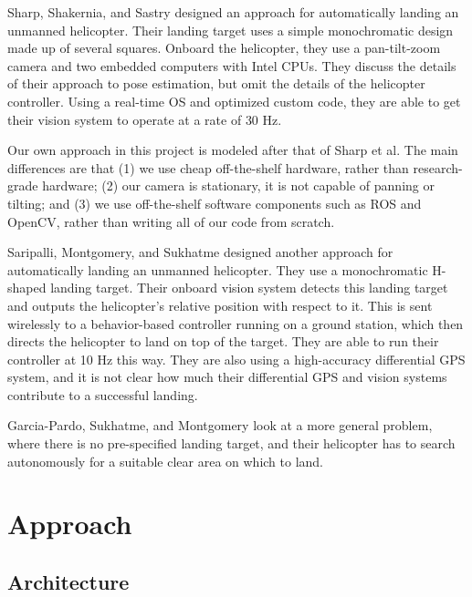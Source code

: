 \documentclass[10pt]{scrartcl} %
\begin{document}
Sharp, Shakernia, and Sastry \cite{sharp_et_al_2001} designed an approach for
automatically landing an unmanned helicopter. Their landing target uses a
simple monochromatic design made up of several squares. Onboard the helicopter,
they use a pan-tilt-zoom camera and two embedded computers with Intel CPUs.
They discuss the details of their approach to pose estimation, but omit the
details of the helicopter controller. Using a real-time OS and optimized custom
code, they are able to get their vision system to operate at a rate of 30 Hz.

Our own approach in this project is modeled after that of Sharp et al. The main
differences are that (1) we use cheap off-the-shelf hardware, rather than
research-grade hardware; (2) our camera is stationary, it is not capable of
panning or tilting; and (3) we use off-the-shelf software components such as
ROS and OpenCV, rather than writing all of our code from scratch.

Saripalli, Montgomery, and Sukhatme \cite{saripalli_et_al_2002} designed
another approach for automatically landing an unmanned helicopter. They use a
monochromatic H-shaped landing target. Their onboard vision system detects this
landing target and outputs the helicopter's relative position with respect to
it. This is sent wirelessly to a behavior-based controller running on a ground
station, which then directs the helicopter to land on top of the target. They
are able to run their controller at 10 Hz this way. They are also using a
high-accuracy differential GPS system, and it is not clear how much their
differential GPS and vision systems contribute to a successful landing.

Garcia-Pardo, Sukhatme, and Montgomery \cite{garcia_pardo_et_al_2002} look at a
more general problem, where there is no pre-specified landing target, and their
helicopter has to search autonomously for a suitable clear area on which to
land.


\section{Approach}

\subsection{Architecture}
\end{document}
